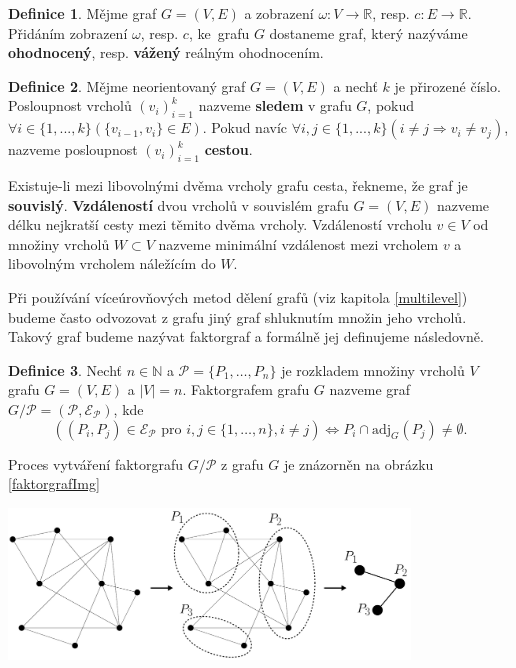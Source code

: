 \documentclass{ctuthesis}
\theoremstyle{plain}
\theoremstyle{definition}
\newtheorem{definition}{Definice}
\begin{document}
\begin{definition}
  Mějme graf $G=(V,E)$ a zobrazení $\omega:V \rightarrow \mathbb{R}$, resp. $c: E \rightarrow \mathbb{R}$. Přidáním zobrazení $\omega$, resp. $c$, ke~grafu $G$ dostaneme graf, který nazýváme \textbf{ohodnocený}, resp. \textbf{vážený} reálným ohodnocením.
\end{definition}

\begin{definition}
  Mějme neorientovaný graf $G=(V,E)$ a nechť $k$ je přirozené číslo. Posloupnost vrcholů $(v_i)_{i=1}^{k}$ nazveme \textbf{sledem} v grafu $G$, pokud $\forall i \in \{1,...,k\} (\{v_{i-1},v_i\} \in E)$. Pokud navíc  $\forall i,j \in \{1,...,k\} (i \neq j \Rightarrow v_i \neq v_j)$, nazveme posloupnost $(v_i)_{i=1}^{k}$ \textbf{cestou}.
\end{definition}

Existuje-li mezi libovolnými dvěma vrcholy grafu cesta, řekneme, že graf je \textbf{souvislý}.
\textbf{Vzdáleností} dvou vrcholů v souvislém grafu $G=(V,E)$ nazveme délku nejkratší cesty mezi těmito dvěma vrcholy. Vzdáleností vrcholu $v \in V$ od množiny vrcholů $W \subset V$ nazveme minimální vzdálenost mezi vrcholem $v$ a libovolným vrcholem náležícím do $W$. 

\medskip

Při používání víceúrovňových metod dělení grafů (viz kapitola \ref{multilevel}) budeme často odvozovat z grafu jiný graf shluknutím množin jeho vrcholů. Takový graf budeme nazývat faktorgraf a formálně jej definujeme následovně.

\begin{definition}
  Nechť $n\in \mathbb{N}$ a $\mathcal{P} = \{P_1,\ldots,P_n\}$ je rozkladem množiny vrcholů $V$ grafu $G = (V, E)$ a $|V|=n$. Faktorgrafem grafu $G$ nazveme graf $G / \mathcal{P} = (\mathcal{P}, \mathcal{E_P})$, kde 
  \[
    \left(
      (P_i, P_j)\in \mathcal{E_P} \mbox{ pro } i,j \in \{1,\ldots,n\}, i \neq j 
    \right)
    \Leftrightarrow {P_i \cap \mathrm{adj}_G(P_j) \neq \emptyset}
    .
  \]
\end{definition}

Proces vytváření faktorgrafu $G / \mathcal{P}$ z grafu $G$ je znázorněn na obrázku \ref{faktorgrafImg}

\bigskip
{
  \centering
  \includegraphics[width=0.8\textwidth]{pictures/faktorgrafcomplete.pdf}
}
\end{document}
